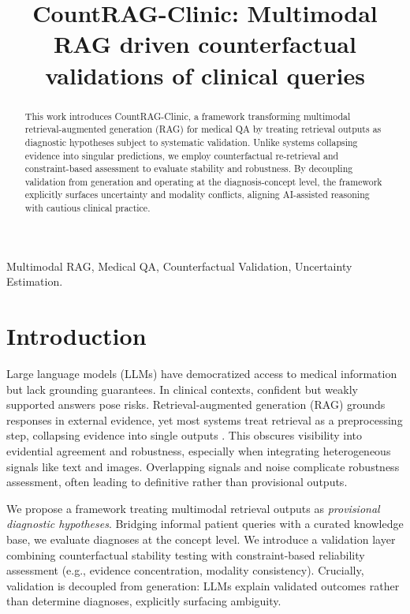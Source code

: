 \documentclass[conference]{IEEEtran}
\begin{document}
\title{CountRAG-Clinic: Multimodal RAG driven counterfactual validations of clinical queries}

\maketitle

\begin{abstract}
This work introduces CountRAG-Clinic, a framework transforming multimodal retrieval-augmented generation (RAG) for medical QA by treating retrieval outputs as diagnostic hypotheses subject to systematic validation. Unlike systems collapsing evidence into singular predictions, we employ counterfactual re-retrieval and constraint-based assessment to evaluate stability and robustness. By decoupling validation from generation and operating at the diagnosis-concept level, the framework explicitly surfaces uncertainty and modality conflicts, aligning AI-assisted reasoning with cautious clinical practice.
\end{abstract}

\begin{IEEEkeywords}
Multimodal RAG, Medical QA, Counterfactual Validation, Uncertainty Estimation.
\end{IEEEkeywords}

\section{Introduction}
Large language models (LLMs) have democratized access to medical information but lack grounding guarantees. In clinical contexts, confident but weakly supported answers pose risks. Retrieval-augmented generation (RAG) grounds responses in external evidence, yet most systems treat retrieval as a preprocessing step, collapsing evidence into single outputs \cite{lewis2020}. This obscures visibility into evidential agreement and robustness, especially when integrating heterogeneous signals like text and images. Overlapping signals and noise complicate robustness assessment, often leading to definitive rather than provisional outputs.

We propose a framework treating multimodal retrieval outputs as \textit{provisional diagnostic hypotheses}. Bridging informal patient queries with a curated knowledge base, we evaluate diagnoses at the concept level. We introduce a validation layer combining counterfactual stability testing with constraint-based reliability assessment (e.g., evidence concentration, modality consistency). Crucially, validation is decoupled from generation: LLMs explain validated outcomes rather than determine diagnoses, explicitly surfacing ambiguity.
\end{document}
